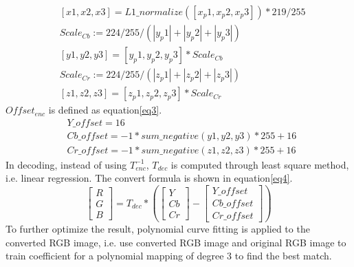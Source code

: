 \documentclass[twocolumn]{article}  %
\begin{document}
\begin{equation}
\begin{aligned}
&\left[x1, x2, x3\right]= L1\_normalize(\left[x_{p}1, x_{p}2, x_{p}3\right])*219/255\\
&Scale_{Cb} := 224/255/(|y_{p}1| + |y_{p}2| + |y_{p}3|) \\
&\left[y1, y2, y3\right] = \left[y_{p}1, y_{p}2, y_{p}3\right]*Scale_{Cb} \\
&Scale_{Cr} := 224/255/(|z_{p}1| + |z_{p}2| + |z_{p}3|) \\
&\left[z1, z2, z3\right] = \left[z_{p}1, z_{p}2, z_{p}3\right]*Scale_{Cr}
\end{aligned}\label{eq2}
\end{equation}
$Offset_{enc}$ is defined as equation\eqref{eq3}.
\begin{equation}
\begin{aligned}
&Y\_offset = 16\\
&Cb\_offset = -1*sum\_negative(y1,y2,y3)*255 + 16\\
&Cr\_offset = -1*sum\_negative(z1,z2,z3)*255 + 16\
\end{aligned}\label{eq3}
\end{equation}
In decoding, instead of using $T_{enc}^{-1}$, $T_{dec}$ is computed through least square method, i.e. linear regression. The convert formula is shown in equation\eqref{eq4}.
\begin{equation}
\left[
\begin{array}{ccc}
R\\
G\\
B
\end{array}
\right]=
T_{dec}*(
\left[
\begin{array}{ccc}
Y  \\
Cb  \\
Cr
\end{array}
\right]
-
\left[
\begin{array}{ccc}
Y\_offset \\
Cb\_offset \\
Cr\_offset
\end{array}
\right])
\label{eq4}
\end{equation}
To further optimize the result, polynomial curve fitting is applied to the converted RGB image, i.e. use converted RGB image and original RGB image to train coefficient for a polynomial mapping of degree 3 to find the best match.
\end{document}
